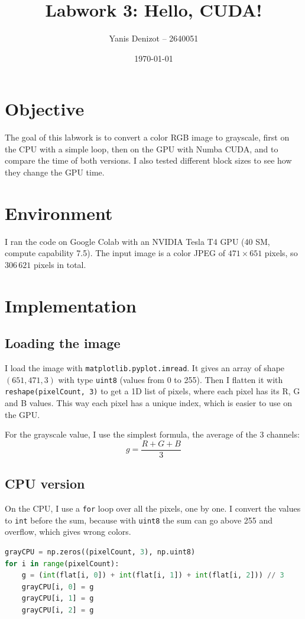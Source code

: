 \documentclass[11pt,a4paper]{article}
\title{Labwork 3: Hello, CUDA!}
\author{Yanis Denizot -- 2640051}
\date{\today}
\begin{document}
\maketitle

\section{Objective}
The goal of this labwork is to convert a color RGB image to grayscale, first on the CPU
with a simple loop, then on the GPU with Numba CUDA, and to compare the time of both
versions. I also tested different block sizes to see how they change the GPU time.

\section{Environment}
I ran the code on Google Colab with an NVIDIA Tesla T4 GPU (40 SM, compute capability 7.5).
The input image is a color JPEG of $471 \times 651$ pixels, so $306\,621$ pixels in total.

\section{Implementation}

\subsection{Loading the image}
I load the image with \texttt{matplotlib.pyplot.imread}. It gives an array of shape
$(651, 471, 3)$ with type \texttt{uint8} (values from 0 to 255). Then I flatten it with
\texttt{reshape(pixelCount, 3)} to get a 1D list of pixels, where each pixel has its R, G
and B values. This way each pixel has a unique index, which is easier to use on the GPU.

For the grayscale value, I use the simplest formula, the average of the 3 channels:
\[
g = \frac{R + G + B}{3}
\]

\subsection{CPU version}
On the CPU, I use a \texttt{for} loop over all the pixels, one by one. I convert the values
to \texttt{int} before the sum, because with \texttt{uint8} the sum can go above 255 and
overflow, which gives wrong colors.

\begin{lstlisting}[language=Python]
grayCPU = np.zeros((pixelCount, 3), np.uint8)
for i in range(pixelCount):
    g = (int(flat[i, 0]) + int(flat[i, 1]) + int(flat[i, 2])) // 3
    grayCPU[i, 0] = g
    grayCPU[i, 1] = g
    grayCPU[i, 2] = g
\end{lstlisting}
\end{document}

